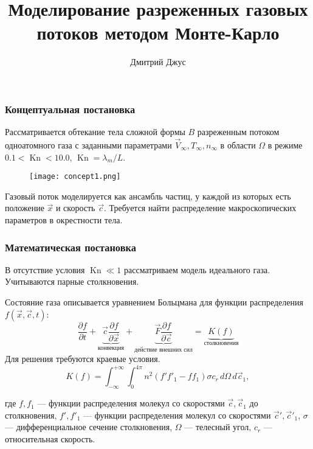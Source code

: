 \documentclass[onlymath]{beamer}
\title{Моделирование разреженных газовых потоков методом Монте-Карло}
\author{Дмитрий Джус}
\newcommand{\pardiff}[2]{\frac{\partial{#1}}{\partial{#2}}}
\DeclareMathOperator\Kn{Kn}
\newcommand\dom{\Omega}
\newcommand{\fp}{\lambda_m}
\newcommand{\dcs}{\sigma}
\newcommand\flowvel{\vec{V}_{\infty}}
\newcommand\flowtemp{T_{\infty}}
\newcommand\flowcon{n_{\infty}}
\begin{document}
\begin{frame}
  \titlepage
\end{frame}

\begin{frame}
  \frametitle{Концептуальная постановка}
  Рассматривается обтекание тела сложной формы $B$ разреженным потоком
  одноатомного газа с заданными параметрами $\flowvel, \flowtemp,
  \flowcon$ в области $\dom$ в режиме $0.1 < \Kn < 10.0$, $\Kn = \fp /
  L$.
  \begin{figure}
    \centering
    \texttt{[image: concept1.png]}
  \end{figure}
  Газовый поток моделируется как ансамбль частиц, у каждой из которых
  есть положение $\vec{x}$ и скорость $\vec{c}$. Требуется найти
  распределение макроскопических параметров в окрестности тела.
\end{frame}

\begin{frame}
  \frametitle{Математическая постановка}
  В отсутствие условия $\Kn \ll 1$ рассматриваем модель идеального
  газа. Учитываются парные столкновения.
  
  Состояние газа описывается уравнением Больцмана для функции
  распределения $f(\vec{x}, \vec{c}, t)$:
\begin{equation*}
  \label{eq:boltzmann}
  \pardiff{f}{t}
  +\underbrace{\vec{c}\pardiff{f}{\vec{x}}}_{\text{конвекция}}
  +\underbrace{\vec{F}\pardiff{f}{\vec{c}}}_{\text{действие внешних сил}}
  = \underbrace{K(f)}_{\text{столкновения}}
\end{equation*}
Для решения требуются краевые условия.
\begin{equation}
  \label{eq:coll-operator}
  K(f) = \int_{-\infty}^{+\infty}\int_{0}^{4\pi}{n^2(f'f'_1 - f
  f_1)\dcs c_r\,d\Omega\,d\vec{c}_1},
\end{equation}

где $f, f_1$ — функции распределения молекул со скоростями $\vec{c},
\vec{c}_1$ до столкновения, $f', f'_1$ — функции распределения молекул
со скоростями $\vec{c}', \vec{c}'_1$, $\dcs$ — дифференциальное
сечение столкновения, $\Omega$ — телесный угол, $c_r$ — относительная
скорость.
\end{frame}
\end{document}
